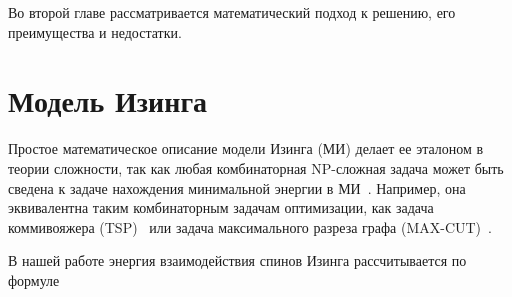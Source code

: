 \documentclass[utf8, babel, sor, jor, amsmath, amssymb, reprint]{elsarticle} %
\begin{document}
	Во второй главе рассматривается математический подход к решению, его преимущества и недостатки.
	
	

	\section{Модель Изинга}
	Простое математическое описание модели Изинга (МИ) делает ее эталоном в теории сложности, так как любая комбинаторная NP-сложная задача может быть сведена к задаче нахождения минимальной энергии в МИ~\cite{Markovich2019}. Например, она эквивалентна таким комбинаторным задачам оптимизации, как задача коммивояжера (TSP)~\cite{papadimitriou1977euclidean} или задача максимального разреза графа ({}MAX-CUT)~\cite{karp2010reducibility}.

	В нашей работе энергия взаимодействия спинов Изинга рассчитывается по формуле
\end{document}

